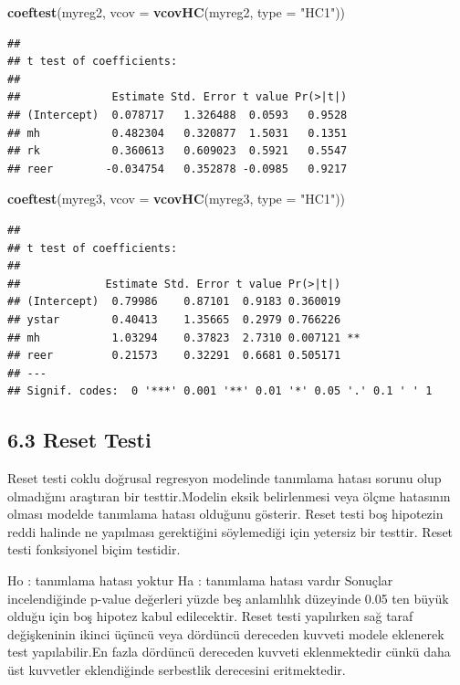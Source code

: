 \documentclass[]{article}
\newenvironment{Shaded}{\begin{snugshade}}{\end{snugshade}}
\newcommand{\KeywordTok}[1]{\textcolor[rgb]{0.13,0.29,0.53}{\textbf{#1}}}
\newcommand{\DataTypeTok}[1]{\textcolor[rgb]{0.13,0.29,0.53}{#1}}
\newcommand{\StringTok}[1]{\textcolor[rgb]{0.31,0.60,0.02}{#1}}
\newcommand{\NormalTok}[1]{#1}
\begin{document}
\begin{Shaded}
\begin{Highlighting}[]
\KeywordTok{coeftest}\NormalTok{(myreg2, }\DataTypeTok{vcov =} \KeywordTok{vcovHC}\NormalTok{(myreg2, }\DataTypeTok{type =} \StringTok{"HC1"}\NormalTok{))}
\end{Highlighting}
\end{Shaded}

\begin{verbatim}
## 
## t test of coefficients:
## 
##              Estimate Std. Error t value Pr(>|t|)
## (Intercept)  0.078717   1.326488  0.0593   0.9528
## mh           0.482304   0.320877  1.5031   0.1351
## rk           0.360613   0.609023  0.5921   0.5547
## reer        -0.034754   0.352878 -0.0985   0.9217
\end{verbatim}

\begin{Shaded}
\begin{Highlighting}[]
\KeywordTok{coeftest}\NormalTok{(myreg3, }\DataTypeTok{vcov =} \KeywordTok{vcovHC}\NormalTok{(myreg3, }\DataTypeTok{type =} \StringTok{"HC1"}\NormalTok{))}
\end{Highlighting}
\end{Shaded}

\begin{verbatim}
## 
## t test of coefficients:
## 
##             Estimate Std. Error t value Pr(>|t|)   
## (Intercept)  0.79986    0.87101  0.9183 0.360019   
## ystar        0.40413    1.35665  0.2979 0.766226   
## mh           1.03294    0.37823  2.7310 0.007121 **
## reer         0.21573    0.32291  0.6681 0.505171   
## ---
## Signif. codes:  0 '***' 0.001 '**' 0.01 '*' 0.05 '.' 0.1 ' ' 1
\end{verbatim}

\subsection{6.3 Reset Testi}\label{reset-testi}

Reset testi coklu doğrusal regresyon modelinde tanımlama hatası sorunu
olup olmadığını araştıran bir testtir.Modelin eksik belirlenmesi veya
ölçme hatasının olması modelde tanımlama hatası olduğunu gösterir. Reset
testi boş hipotezin reddi halinde ne yapılması gerektiğini söylemediği
için yetersiz bir testtir. Reset testi fonksiyonel biçim testidir.

Ho : tanımlama hatası yoktur Ha : tanımlama hatası vardır Sonuçlar
incelendiğinde p-value değerleri yüzde beş anlamlılık düzeyinde 0.05 ten
büyük olduğu için boş hipotez kabul edilecektir. Reset testi yapılırken
sağ taraf değişkeninin ikinci üçüncü veya dördüncü dereceden kuvveti
modele eklenerek test yapılabilir.En fazla dördüncü dereceden kuvveti
eklenmektedir cünkü daha üst kuvvetler eklendiğinde serbestlik
derecesini eritmektedir.
\end{document}
